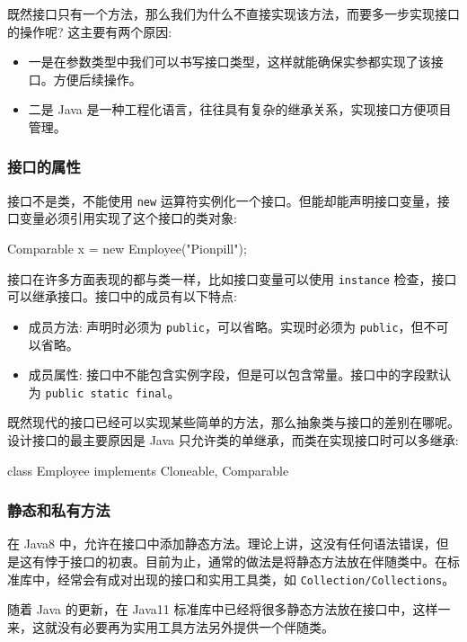 既然接口只有一个方法，那么我们为什么不直接实现该方法，而要多一步实现接口的操作呢? 这主要有两个原因:
\begin{itemize}
    \item 一是在参数类型中我们可以书写接口类型，这样就能确保实参都实现了该接口。方便后续操作。
    \item 二是 Java 是一种工程化语言，往往具有复杂的继承关系，实现接口方便项目管理。
\end{itemize}

\subsubsection{接口的属性}

接口不是类，不能使用 \texttt{new} 运算符实例化一个接口。但能却能声明接口变量，接口变量必须引用实现了这个接口的类对象:
\begin{Java}
Comparable x = new Employee("Pionpill");
\end{Java}

接口在许多方面表现的都与类一样，比如接口变量可以使用 \texttt{instance} 检查，接口可以继承接口。接口中的成员有以下特点:
\begin{itemize}
    \item 成员方法: 声明时必须为 \texttt{public}，可以省略。实现时必须为 \texttt{public}，但不可以省略。
    \item 成员属性: 接口中不能包含实例字段，但是可以包含常量。接口中的字段默认为 \texttt{public static final}。
\end{itemize}

既然现代的接口已经可以实现某些简单的方法，那么抽象类与接口的差别在哪呢。设计接口的最主要原因是 Java 只允许类的单继承，而类在实现接口时可以多继承:
\begin{Java}
class Employee implements Cloneable, Comparable
\end{Java}

\subsubsection{静态和私有方法}

在 Java8 中，允许在接口中添加静态方法。理论上讲，这没有任何语法错误，但是这有悖于接口的初衷。目前为止，通常的做法是将静态方法放在伴随类中。在标准库中，经常会有成对出现的接口和实用工具类，如 \texttt{Collection/Collections}。

随着 Java 的更新，在 Java11 标准库中已经将很多静态方法放在接口中，这样一来，这就没有必要再为实用工具方法另外提供一个伴随类。

